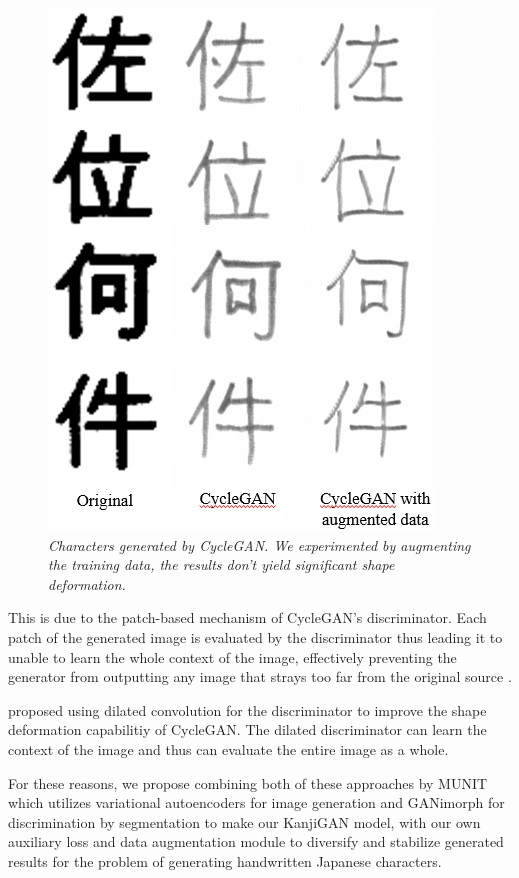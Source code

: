 \documentclass[12pt]{report}
\begin{document}
\begin{figure}[h]
	\centering
	\includegraphics[scale=1]{kanji-example}
	\caption{\textit{Characters generated by CycleGAN. We experimented by augmenting the training data, the results don't yield significant shape deformation.}}
	\label{fig:kanji-example}
\end{figure}


This is due to the patch-based mechanism of CycleGAN's discriminator. Each patch of the generated image is evaluated by the discriminator thus leading it to unable to learn the whole context of the image, effectively preventing the generator from outputting any image that strays too far from the original source \cite{ganimorph}.

\cite{ganimorph} proposed using dilated convolution for the discriminator to improve the shape deformation capabilitiy of CycleGAN. The dilated discriminator can learn the context of the image and thus can evaluate the entire image as a whole. 

For these reasons, we propose combining both of these approaches by MUNIT\cite{munit} which utilizes variational autoencoders for image generation and GANimorph\cite{ganimorph} for discrimination by segmentation to make our KanjiGAN model, with our own auxiliary loss and data augmentation module to diversify and stabilize generated results for the problem of generating handwritten Japanese characters.
\end{document}
